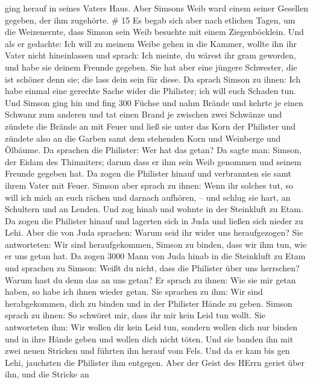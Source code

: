 ging herauf in seines Vaters Haus.  Aber Simsons Weib ward
einem seiner Gesellen gegeben, der ihm zugehörte. \# 15  Es
begab sich aber nach etlichen Tagen, um die Weizenernte, dass Simson
sein Weib besuchte mit einem Ziegenböcklein. Und als er gedachte: Ich
will zu meinem Weibe gehen in die Kammer, wollte ihn ihr Vater nicht
hineinlassen  und sprach: Ich meinte, du wärest ihr gram
geworden, und habe sie deinem Freunde gegeben. Sie hat aber eine jüngere
Schwester, die ist schöner denn sie; die lass dein sein für diese.
 Da sprach Simson zu ihnen: Ich habe einmal eine gerechte
Sache wider die Philister; ich will euch Schaden tun.  Und
Simson ging hin und fing 300 Füchse und nahm Brände und kehrte je einen
Schwanz zum anderen und tat einen Brand je zwischen zwei Schwänze
 und zündete die Brände an mit Feuer und ließ sie unter das
Korn der Philister und zündete also an die Garben samt dem stehenden
Korn und Weinberge und Ölbäume.  Da sprachen die Philister:
Wer hat das getan? Da sagte man: Simson, der Eidam des Thimniters; darum
dass er ihm sein Weib genommen und seinem Freunde gegeben hat. Da zogen
die Philister hinauf und verbrannten sie samt ihrem Vater mit Feuer.
 Simson aber sprach zu ihnen: Wenn ihr solches tut, so will
ich mich an euch rächen und darnach aufhören, --  und schlug
sie hart, an Schultern und an Lenden. Und zog hinab und wohnte in der
Steinkluft zu Etam.  Da zogen die Philister hinauf und
lagerten sich in Juda und ließen sich nieder zu Lehi.  Aber
die von Juda sprachen: Warum seid ihr wider uns heraufgezogen? Sie
antworteten: Wir sind heraufgekommen, Simson zu binden, dass wir ihm
tun, wie er uns getan hat.  Da zogen 3000 Mann von Juda
hinab in die Steinkluft zu Etam und sprachen zu Simson: Weißt du nicht,
dass die Philister über uns herrschen? Warum hast du denn das an uns
getan? Er sprach zu ihnen: Wie sie mir getan haben, so habe ich ihnen
wieder getan.  Sie sprachen zu ihm: Wir sind herabgekommen,
dich zu binden und in der Philister Hände zu geben. Simson sprach zu
ihnen: So schwöret mir, dass ihr mir kein Leid tun wollt. 
Sie antworteten ihm: Wir wollen dir kein Leid tun, sondern wollen dich
nur binden und in ihre Hände geben und wollen dich nicht töten. Und sie
banden ihn mit zwei neuen Stricken und führten ihn herauf vom Fels.
 Und da er kam bis gen Lehi, jauchzten die Philister ihm
entgegen. Aber der Geist des HErrn geriet über ihn, und die Stricke an

